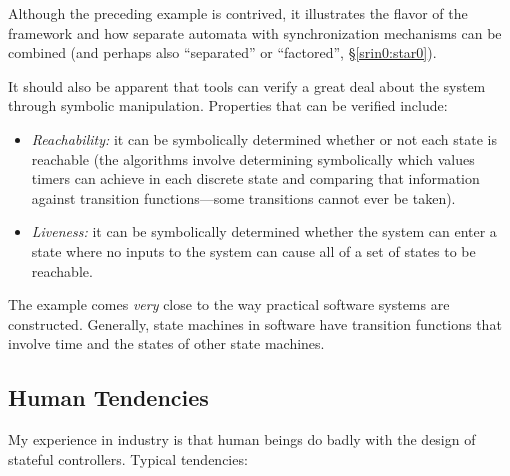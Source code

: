 \documentclass[letterpaper,10pt,titlepage]{article}
\begin{document}
Although the preceding example is contrived, it illustrates the flavor
of the framework and how separate automata with synchronization mechanisms can be
combined (and perhaps also ``separated'' or ``factored'', \S{}\ref{srin0:star0}).

It should also be apparent that tools can verify a great deal about
the system through symbolic manipulation.  Properties that can be verified
include:

\begin{itemize}
\item \emph{Reachability:} it can be symbolically determined whether
      or not each state is reachable (the algorithms involve determining
      symbolically which values timers can achieve in each discrete state and
      comparing that information against transition functions---some transitions
      cannot ever be taken).
\item \emph{Liveness:} it can be symbolically determined whether the system
      can enter a state where no inputs to the system can cause all of a
      set of states to be reachable.
\end{itemize}

The example comes \emph{very} close to the way practical
software systems are constructed.  Generally, state machines in 
software have transition functions that involve time and the states of
other state machines.



\subsection{Human Tendencies}
\label{staf0:shtd0}

My experience in industry is that human beings do badly with the
design of stateful controllers.  Typical tendencies:
\end{document}
